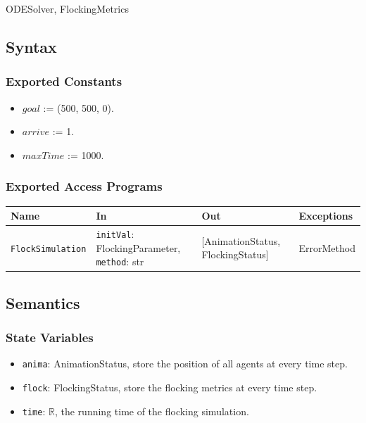 \documentclass[12pt, titlepage]{article}
\begin{document}
ODESolver, FlockingMetrics

\subsection{Syntax}

\subsubsection{Exported Constants}

\begin{itemize}
\item $goal$ := (500, 500, 0).
\item $arrive$ := 1.
\item $maxTime$ := 1000.
\end{itemize}

\subsubsection{Exported Access Programs}

\begin{center}
\begin{tabular}{p{4cm} p{4cm} p{4cm} p{2cm}}
\hline
\textbf{Name} & \textbf{In} & \textbf{Out} & \textbf{Exceptions} \\
\hline
\texttt{FlockSimulation} & \texttt{initVal}: FlockingParameter, \texttt{method}: str & [AnimationStatus, FlockingStatus] & ErrorMethod \\
\hline
\end{tabular}
\end{center}

\subsection{Semantics}

\subsubsection{State Variables}

\begin{itemize}
\item \texttt{anima}: AnimationStatus, store the position of all agents at every time step. 
\item \texttt{flock}: FlockingStatus, store the flocking metrics at every time step. 
\item \texttt{time}: $\mathbb{R}$, the running time of the flocking simulation. 
\end{itemize}
\end{document}
